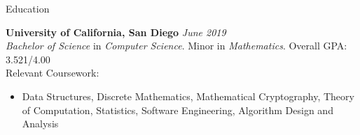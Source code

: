 \documentclass{resume} %
\begin{document}

\begin{rSection}{Education}

{\bf University of California, San Diego} \hfill {\em June 2019} 
\\ \textit{Bachelor of Science} in \textit{Computer Science}. Minor in \textit{Mathematics}. \hfill { Overall GPA: 3.521/4.00}
\\ Relevant Coursework:
\begin{itemize}
    \setlength\itemsep{0.4em}
    \item Data Structures, Discrete Mathematics, Mathematical Cryptography, Theory of Computation, Statistics, Software Engineering, Algorithm Design and Analysis
\end{itemize}


\end{rSection}
\end{document}
